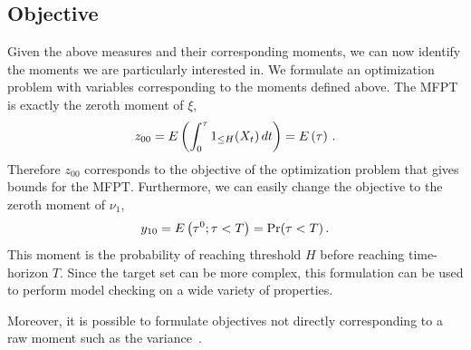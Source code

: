 \subsection{Objective}
Given the above measures and their corresponding moments, we can
now identify the moments we are particularly interested in.
We formulate an optimization problem with variables corresponding 
to the moments defined above.
The \ac{MFPT} is exactly the zeroth moment of $\xi$,
\[
	z_{00}={E}\left(\int_0^{\tau}1_{\leq H}(X_t)\,dt\right) = {E}\left(\tau\right)\,.
\]
Therefore $z_{00}$ corresponds to the objective of the optimization problem
that gives bounds for the \ac{MFPT}.
Furthermore, we can easily change the objective to the  
zeroth moment of $\nu_1$,
\[
	y_{10} = {E}\left(\tau^0;\tau<T\right)=\Pr(\tau < T)\,.
\]
This moment is the probability of reaching
threshold $H$ before reaching time-horizon $T$. Since the target set can be more complex, this formulation can be used to perform model checking on a
wide variety of properties.

Moreover, it is possible to formulate objectives not directly corresponding to
a raw moment such as the variance~\cite{sakurai2019bounding,dowdy2018bounds}.

